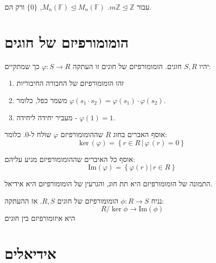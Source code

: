 \documentclass{tstextbook}
\begin{document}
\begin{example}
עבור \(m\mathbb{Z} \trianglelefteq \mathbb{Z}\). \(M_{n}\left( \mathbb{F} \right)\trianglelefteq M_{n}\left( \mathbb{F} \right)\), \(\{ 0 \}\) ורק הם.

\end{example}
\section{הומומורפיזם של חוגים}

\begin{definition}
יהיו \(S,R\) חוגים. הומומורפיזם של חוגים זו העתקה \(\varphi:S\to R\) כך שמתקיים:

  \begin{enumerate}
    \item זהו הומומורפיזם של החבורה החיבוריות 


    \item משמר כפל, כלומר \(\varphi\left( s_{1}\cdot s_{2} \right)=\varphi(s_{1})\cdot \varphi(s_{2})\). 


    \item מעביר יחידה ליחידה - \(\varphi(1)=1\). 


  \end{enumerate}
\end{definition}
\begin{definition}
אוסף האברים בחוג \(R\) שההומומורפיזם \(\varphi\) שולח ל-0. כלומר:
$${\mathrm{ker}}\,\left( \varphi \right)=\left\{r\in R\,|\,\varphi\,(r)=0\right\}$$

\end{definition}
\begin{definition}
אוסף כל האיברים שההומומורפיזם מגיע עליהם:
$${\mathrm{Im}}\left( \varphi \right)=\left\{\varphi\left(r\right)\left|\,r\in R\right\}\right.$$

\end{definition}
\begin{proposition}
התמונה של הומומורפיזם היא תת חוג, והגרעין של הומומורפיזם היא אידיאל.

\end{proposition}
\begin{proposition}
נניח \(\phi:R\to S\) הומומורפיזם של חוגים \(R,S\). אז ההעתקה:
$$R / \ker \phi \to \mathrm{Im}\left( \phi \right)$$
היא איזומורפיזם בין חוגים

\end{proposition}
\section{אידיאלים}
\end{document}
